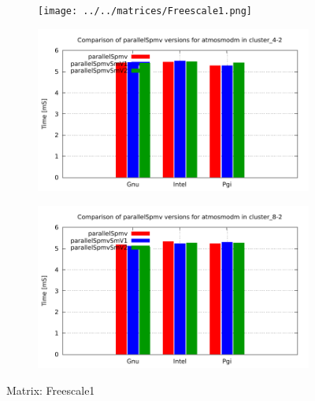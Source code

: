 \begin{figure} [ht!]
    \centering
    \captionsetup{justification=centering, singlelinecheck=false}
    \begin{subfigure}{.25\textwidth}
      \centering
      \hspace*{-1.5cm} 
      \texttt{[image: ../../matrices/Freescale1.png]}
      \label{fig:Freescale1_matrix}
    \end{subfigure}%
    \begin{subfigure}{.37\textwidth}
      \centering
      \hspace*{-1.0cm} 
      \includegraphics[page=3, width=0.95\linewidth]{../plots/myCluster_4-2.pdf}
      \label{fig:Freescale1_performance}
    \end{subfigure}
    \begin{subfigure}{.37\textwidth}
      \centering
      \hspace*{-1.0cm} 
      \includegraphics[page=3, width=0.95\linewidth]{../plots/myCluster_8-2.pdf}
      \label{fig:Freescale1_performance}
    \end{subfigure}
\caption{Matrix: Freescale1}
\label{fig:Freescale1}
\end{figure}

